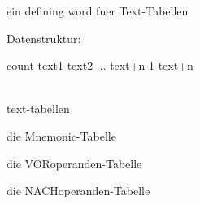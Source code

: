                                         
                                         
                                         
                                         
                                         
ein defining word fuer Text-Tabellen     
                                         
Datenstruktur:                           
                                         
count text1 text2 ... text+n-1 text+n    
                                         
                                         
                                         
                                         
                                         
                                         
                                         
                                         
                                        
\\ text-tabellen                         
                                         
die Mnemonic-Tabelle                     
                                         
                                         
                                         
                                         
                                         
                                         
                                         
                                         
die VORoperanden-Tabelle                 
                                         
                                         
                                         
die NACHoperanden-Tabelle                
                                         
                                         
                                         
                                         
                                         
                                         
                                         
